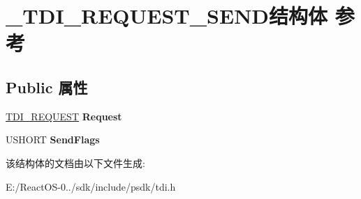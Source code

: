 \hypertarget{struct___t_d_i___r_e_q_u_e_s_t___s_e_n_d}{}\section{\+\_\+\+T\+D\+I\+\_\+\+R\+E\+Q\+U\+E\+S\+T\+\_\+\+S\+E\+N\+D结构体 参考}
\label{struct___t_d_i___r_e_q_u_e_s_t___s_e_n_d}
\subsection*{Public 属性}
\begin{DoxyCompactItemize}
\item 
\mbox{\label{struct___t_d_i___r_e_q_u_e_s_t___s_e_n_d_a32f412b6a28bef1b425ca6cae8fa5146}} 
\hyperlink{struct___t_d_i___r_e_q_u_e_s_t}{T\+D\+I\+\_\+\+R\+E\+Q\+U\+E\+ST} {\bfseries Request}
\item 
\mbox{\label{struct___t_d_i___r_e_q_u_e_s_t___s_e_n_d_ac2d62bdb9a1561ce11003a03a5fabaf9}} 
U\+S\+H\+O\+RT {\bfseries Send\+Flags}
\end{DoxyCompactItemize}


该结构体的文档由以下文件生成\+:\begin{DoxyCompactItemize}
\item 
E\+:/\+React\+O\+S-\/0../sdk/include/psdk/tdi.\+h\end{DoxyCompactItemize}
